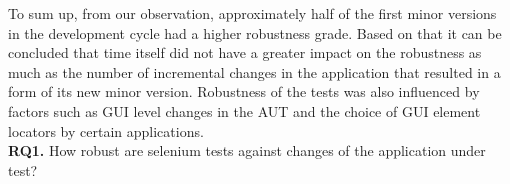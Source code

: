 To sum up, from our observation, approximately half of the first minor versions in the development cycle had a higher robustness grade. Based on that it can be concluded that time itself did not have a greater impact on the robustness as much as the number of incremental changes in the application that resulted in a form of its new minor version. Robustness of the tests was also influenced by factors such as GUI level changes in the AUT and the choice of GUI element locators by certain applications.\\




\noindent\textbf{RQ1.} How robust are selenium tests against changes of the application under test?

